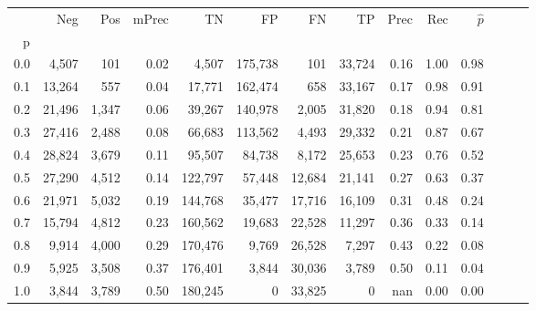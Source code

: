 \begin{tabular}{rrrrrrrrrrrrrr}
\toprule
{} &     Neg &    Pos & mPrec &       TN &       FP &      FN &      TP &  Prec &   Rec & $\hat{p}$ \\
p   &         &        &       &          &          &         &         &       &       &           \\
\midrule
0.0 &   4,507 &    101 &  0.02 &    4,507 &  175,738 &     101 &  33,724 &  0.16 &  1.00 &      0.98 \\
0.1 &  13,264 &    557 &  0.04 &   17,771 &  162,474 &     658 &  33,167 &  0.17 &  0.98 &      0.91 \\
0.2 &  21,496 &  1,347 &  0.06 &   39,267 &  140,978 &   2,005 &  31,820 &  0.18 &  0.94 &      0.81 \\
0.3 &  27,416 &  2,488 &  0.08 &   66,683 &  113,562 &   4,493 &  29,332 &  0.21 &  0.87 &      0.67 \\
0.4 &  28,824 &  3,679 &  0.11 &   95,507 &   84,738 &   8,172 &  25,653 &  0.23 &  0.76 &      0.52 \\
0.5 &  27,290 &  4,512 &  0.14 &  122,797 &   57,448 &  12,684 &  21,141 &  0.27 &  0.63 &      0.37 \\
0.6 &  21,971 &  5,032 &  0.19 &  144,768 &   35,477 &  17,716 &  16,109 &  0.31 &  0.48 &      0.24 \\
0.7 &  15,794 &  4,812 &  0.23 &  160,562 &   19,683 &  22,528 &  11,297 &  0.36 &  0.33 &      0.14 \\
0.8 &   9,914 &  4,000 &  0.29 &  170,476 &    9,769 &  26,528 &   7,297 &  0.43 &  0.22 &      0.08 \\
0.9 &   5,925 &  3,508 &  0.37 &  176,401 &    3,844 &  30,036 &   3,789 &  0.50 &  0.11 &      0.04 \\
1.0 &   3,844 &  3,789 &  0.50 &  180,245 &        0 &  33,825 &       0 &   nan &  0.00 &      0.00 \\
\bottomrule
\end{tabular}
